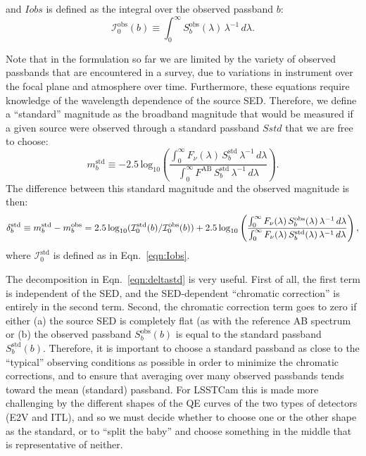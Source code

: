 \documentclass[SE,authoryear,lsstdraft,toc]{lsstdoc}
\newcommand{\mobs}{m_b^{\mathrm{obs}}}
\newcommand{\mstd}{m_b^{\mathrm{std}}}
\newcommand{\Sobs}{S_b^{\mathrm{obs}}}
\newcommand{\Sstd}{S_b^{\mathrm{std}}}
\newcommand{\Iobs}{\mathcal{I}_0^{\mathrm{obs}}}
\newcommand{\Istd}{\mathcal{I}_0^{\mathrm{std}}}
\begin{document}
and $Iobs$ is defined as the integral over the observed passband $b$:
%
\begin{equation}
\label{eqn:Iobs}
\Iobs(b) \equiv \int_0^\infty \Sobs(\lambda)\,\lambda^{-1}\,d\lambda.
\end{equation}
%

Note that in the formulation so far we are limited by the variety of observed
passbands that are encountered in a survey, due to variations in instrument
over the focal plane and atmosphere over time.  Furthermore, these equations
require knowledge of the wavelength dependence of the source SED.  Therefore,
we define a ``standard'' magnitude as the broadband magnitude that would be
measured if a given source were observed through a standard passband $Sstd$
that we are free to choose:
%
\begin{equation}
\mstd \equiv -2.5\,\mathrm{log}_{10} \left ( \frac{\int_0^\infty
  F_\nu(\lambda)\,\Sstd\,\lambda^{-1}\,d\lambda}{\int_0^\infty
  F^{\mathrm{AB}}\,\Sstd\,\lambda^{-1}\,d\lambda} \right ).
\end{equation}
%
The difference between this standard magnitude and the observed magnitude is
then:
%
\begin{equation}
\label{eqn:deltastd}
\delta_b^{\mathrm{std}} \equiv \mstd - \mobs\\
= 2.5\,\mathrm{log}_{10}(\Istd(b)/\Iobs(b))\\
+ 2.5\,\mathrm{log}_{10} \left ( \frac{\int_0^{\infty}
  F_\nu(\lambda)\,\Sobs(\lambda)\,\lambda^{-1}\,d\lambda}{\int_0^{\infty}
  F_\nu(\lambda)\,\Sstd(\lambda)\,\lambda^{-1}\,d\lambda} \right ),
\end{equation}
%
where $\Istd$ is defined as in Eqn.~\ref{eqn:Iobs}.

The decomposition in Eqn.~\ref{eqn:deltastd} is very useful.  First of all, the
first term is independent of the SED, and the SED-dependent ``chromatic
correction'' is entirely in the second term.  Second, the chromatic correction
term goes to zero if either (a) the source SED is completely flat (as with the
reference AB spectrum or (b) the observed passband $\Sobs(b)$ is equal to the
standard passband $\Sstd(b)$.  Therefore, it is important to choose a standard
passband as close to the ``typical'' observing conditions as possible in order
to minimize the chromatic corrections, and to ensure that averaging over many
observed passbands tends toward the mean (standard) passband.  For LSSTCam this
is made more challenging by the different shapes of the QE curves of the two
types of detectors (E2V and ITL), and so we must decide whether to choose one
or the other shape as the standard, or to ``split the baby'' and choose
something in the middle that is representative of neither.
\end{document}

